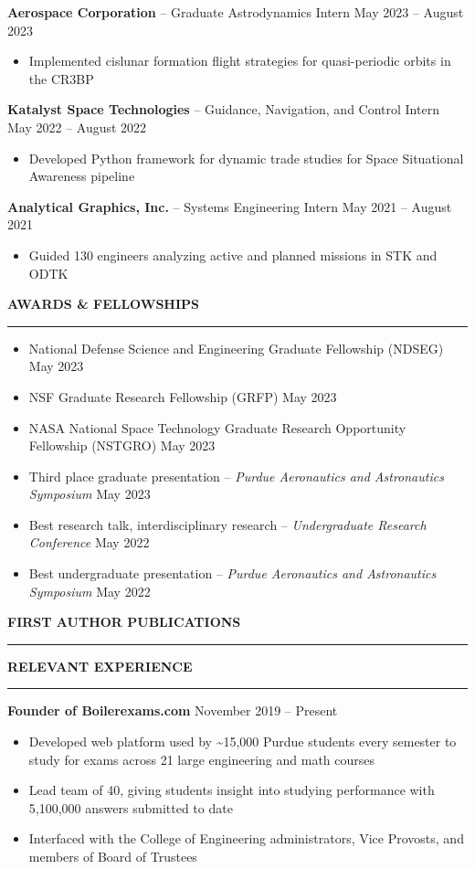 \documentclass[11pt, a4paper]{article}
\newcommand{\sectiontitle}[1]{{\Large \textbf{#1}}\vspace{0.5em}\hrule\vspace{0.5em}}
\begin{document}
\textbf{Aerospace Corporation} -- Graduate Astrodynamics Intern \hfill May 2023 -- August 2023
\begin{itemize}[noitemsep]
    \item Implemented cislunar formation flight strategies for quasi-periodic orbits in the CR3BP
\end{itemize}

\textbf{Katalyst Space Technologies} -- Guidance, Navigation, and Control Intern \hfill May 2022 -- August 2022
\begin{itemize}[noitemsep]
    \item Developed Python framework for dynamic trade studies for Space Situational Awareness pipeline
\end{itemize}

\textbf{Analytical Graphics, Inc.} -- Systems Engineering Intern \hfill May 2021 -- August 2021
\begin{itemize}[noitemsep]
    \item Guided 130 engineers analyzing active and planned missions in STK and ODTK
\end{itemize}

\sectiontitle{AWARDS \& FELLOWSHIPS}
\begin{itemize}[noitemsep]
    \item National Defense Science and Engineering Graduate Fellowship (NDSEG) \hfill May 2023
    \item NSF Graduate Research Fellowship (GRFP) \hfill May 2023
    \item NASA National Space Technology Graduate Research Opportunity Fellowship (NSTGRO) \hfill May 2023
    \item Third place graduate presentation -- \textit{Purdue Aeronautics and Astronautics Symposium} \hfill May 2023
    \item Best research talk, interdisciplinary research -- \textit{Undergraduate Research Conference} \hfill May 2022
    \item Best undergraduate presentation -- \textit{Purdue Aeronautics and Astronautics Symposium} \hfill May 2022
\end{itemize}

\sectiontitle{FIRST AUTHOR PUBLICATIONS}
\nocite{*}
\printbibliography[heading=none]

\sectiontitle{RELEVANT EXPERIENCE}
\textbf{Founder of Boilerexams.com} \hfill November 2019 -- Present
\begin{itemize}[noitemsep]
    \item Developed web platform used by \textasciitilde15,000 Purdue students every semester to study for exams across 21 large engineering and math courses
    \item Lead team of 40, giving students insight into studying performance with 5,100,000 answers submitted to date
    \item Interfaced with the College of Engineering administrators, Vice Provosts, and members of Board of Trustees
\end{itemize}
\end{document}
